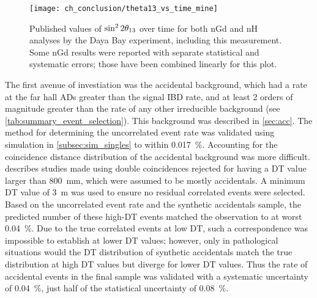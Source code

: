 \begin{figure}
    \centering
    \texttt{[image: ch\_conclusion/theta13\_vs\_time\_mine]}
    \caption[This measurement compared to earlier results]{
        Published values of $\sin^{2}2\theta_{13}$ over time
        for both nGd and nH analyses by the Daya Bay experiment,
        including this measurement.
        Some nGd results were reported with separate statistical
        and systematic errors;
        those have been combined linearly for this plot.
    }
    \label{fig:theta13_vs_t_mine}
\end{figure}

The first avenue of investiation was the accidental background,
which had a rate at the far hall ADs greater than the signal IBD rate,
and at least 2 orders of magnitude greater than the rate
of any other irreducible background (see \cref{tab:summary_event_selection}).
This background was described in \cref{sec:acc}.
The method for determining the uncorrelated event rate
was validated using simulation in \cref{subsec:sim_singles}
to within \SI{0.017}{\percent}.
Accounting for the coincidence distance distribution of the accidental background
was more difficult.
 describes studies made using double coincidences
rejected for having a DT value larger than \SI{800}{\mm},
which were assumed to be mostly accidentals.
A minimum DT value of \SI{3}{\m} was used to ensure no residual correlated events
were selected.
Based on the uncorrelated event rate and the synthetic accidentals sample,
the predicted number of these high-DT events matched the observation
to at worst \SI{0.04}{\percent}.
Due to the true correlated events at low DT, such a correspondence
was impossible to establish at lower DT values;
however, only in pathological situations
would the DT distribution of synthetic accidentals match the true distribution
at high DT values but diverge for lower DT values.
Thus the rate of accidental events in the final sample
was validated with a systematic uncertainty of \SI{0.04}{\percent},
just half of the statistical uncertainty of \SI{0.08}{\percent}.

